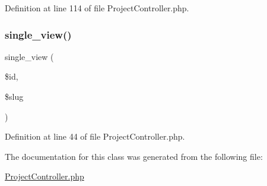 Definition at line 114 of file Project\+Controller.\+php.

\mbox{\label{class_responsive_1_1_http_1_1_controllers_1_1_project_controller_a75bba3b2facab10a4744ac5d8cf333da}} 
\subsubsection{\texorpdfstring{single\_view()}{single\_view()}}
{\footnotesize\ttfamily single\+\_\+view (\begin{DoxyParamCaption}\item[{}]{\$id,  }\item[{}]{\$slug }\end{DoxyParamCaption})}



Definition at line 44 of file Project\+Controller.\+php.



The documentation for this class was generated from the following file\+:\begin{DoxyCompactItemize}
\item 
\mbox{\hyperlink{_project_controller_8php}{Project\+Controller.\+php}}\end{DoxyCompactItemize}
